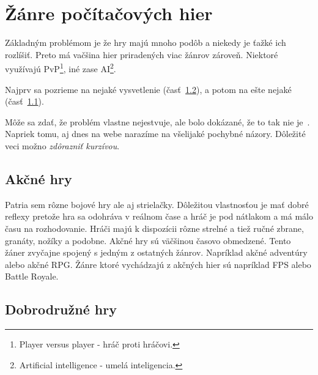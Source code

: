 \documentclass[10pt,twoside,slovak,a4paper]{article}
\begin{document}
\section{Žánre počítačových hier} \label{zanre}

Základným problémom je že hry majú mnoho podôb a niekedy je ťažké ich rozlíšiť. Preto má vačšina hier priradených viac žánrov zároveň. Niektoré využívajú PvP\footnote{Player versus player - hráč proti hráčovi.}, iné zase AI\footnote{Artificial intelligence - umelá inteligencia.}.

Najprv sa pozrieme na nejaké vysvetlenie (časť~\ref{zanre:adventure}), a potom na ešte nejaké (časť~\ref{zanre:akcne}).

Môže sa zdať, že problém vlastne nejestvuje\cite{Coplien:MPD}, ale bolo dokázané, že to tak nie je~\cite{Czarnecki:Staged, Czarnecki:Progress}. Napriek tomu, aj dnes na webe narazíme na všelijaké pochybné názory\cite{PLP-Framework}. Dôležité veci možno \emph{zdôrazniť kurzívou}.

\cite{sahay}

\subsection{Akčné hry} \label{zanre:akcne}

Patria sem rôzne bojové hry ale aj strielačky. Dôležitou vlastnosťou je mať dobré reflexy pretože hra sa odohráva v reálnom čase a hráč je pod nátlakom a má málo času na rozhodovanie. Hráči majú k dispozícii rôzne strelné a tiež ručné zbrane, granáty, nožíky a podobne. Akčné hry sú väčšinou časovo obmedzené. Tento žáner zvyčajne spojený s jedným z ostatných žánrov. Napríklad akčné adventúry alebo akčné RPG. Žánre ktoré vychádzajú z akčných hier sú napríklad FPS alebo Battle Royale.


\subsection{Dobrodružné hry} \label{zanre:adventure}
\end{document}
